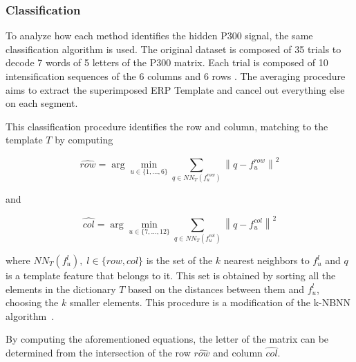 \documentclass[sensors,article,submit,moreauthors,pdftex,10pt,a4paper]{mdpi}
\begin{document}
\subsubsection{Classification} \label{section:classification}

To analyze how each method identifies the hidden P300 signal, the same classification algorithm is used.   The original dataset is composed of 35 trials to decode 7 words of 5 letters  of the P300 matrix.  Each trial is composed of 10 intensification sequences of the 6 columns and 6 rows \citep{Riccio2013}.  The averaging procedure aims to extract the superimposed ERP Template and cancel out everything else on each segment.  

This classification procedure identifies the row and column, matching to the template $T$ by computing  

\begin{equation}
\hat{row} = \arg \min_{u \in \{1,\dots,6\}} \sum_{q \in NN_T(f^{row}_u)}^{} \left\lVert q -  f^{row}_u \right\rVert ^2
\label{eq:multiclassificationrow}
\end{equation}

\noindent and

\begin{equation}
\hat{col} = \arg \min_{u \in \{7,\dots,12\}} \sum_{q \in NN_T(f^{col}_u)}^{} \left\lVert q -  f^{col}_u \right\rVert ^2
\label{eq:multiclassificationcol}
\end{equation}

\noindent where $NN_T(f^l_u),\;l\in\{row,{col}\}$  is the set of the $k$ nearest neighbors to $f^l_u$ and $q$ is a template feature that belongs to it.  This set is obtained by sorting all the elements in the dictionary $T$ based on the distances between them and $f^l_u$, choosing the $k$ smaller elements. This procedure is a modification of the k-NBNN  algorithm~\citep{Boiman2008}.

By computing the aforementioned equations, the letter of the matrix can be determined from the intersection of the row $ \hat{row} $ and column $ \hat{col} $.  %


\end{document}
